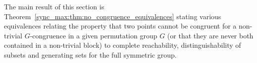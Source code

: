 









The main result of this section is Theorem~\ref{sync_max:thm:no_congruence_equivalences}
stating various equivalences relating  the property 
that two points cannot
be congruent for a non-trivial $G$-congruence in a given permutation group $G$
(or that they are never both contained in a non-trivial block)
to complete reachability, distinguishability
of subsets and generating sets for the full symmetric group.





